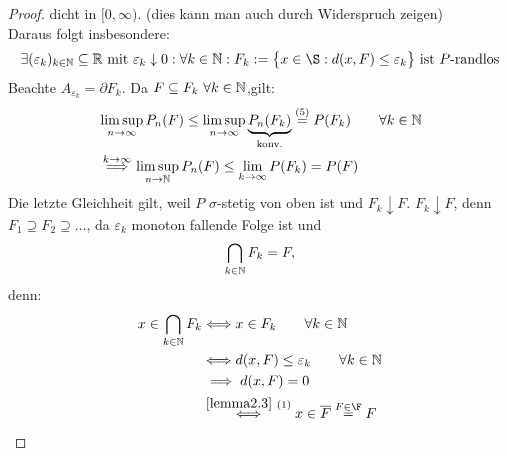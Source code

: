 \begin{proof}
dicht in $[0,\infty)$. (dies kann man auch durch Widerspruch zeigen)\\
Daraus folgt insbesondere:
\begin{align*}
\exists(\varepsilon_k)_{k\in\N}\subseteq\R\mit\varepsilon_k\downarrow0:\forall	 k\in\N: F_k:=\big\lbrace x\in\S:d(x,F)\leq\varepsilon_k\big\rbrace\text{ ist $P$-randlos}
\end{align*}
Beachte $A_{\varepsilon_k}=\partial F_k$. Da $F\subseteq F_k~\forall k\in\mathbb{N}$,gilt:
\begin{align*}
&\limsup\limits_{n\to\infty} P_n(F)
\leq\limsup\limits_{n\to\infty} \underbrace{P_n(F_k)}_{\text{konv.}}
\stackrel{(5)}{=}
P(F_k)\qquad\forall k\in\mathbb{N}\\
&\stackrel{k\to\infty}{\implies}
\limsup\limits_{n\to\mathbb{N}} P_n(F)
\leq\lim\limits_{k\to\infty} P(F_k)
=P(F)
\end{align*}
Die letzte Gleichheit gilt, weil $P$ $\sigma$-stetig von oben ist und $F_k\downarrow F$. $F_k\downarrow F$, denn $F_1\supseteq F_2\supseteq\ldots$, da $\varepsilon_k$ monoton fallende Folge ist und
\begin{align*}
\bigcap\limits_{k\in\mathbb{N}}F_k=F, 
\end{align*}
denn: 
\begin{align*}
x\in\bigcap\limits_{k\in\N}F_k
&\Longleftrightarrow
x\in F_k\qquad\forall k\in\N\\
&\Longleftrightarrow
d(x,F)\leq\varepsilon_k\qquad\forall k\in\N\\
&\implies
d(x,F)=0\\
&\stackrel{\ref{lemma2.3}~(1)}{\Longleftrightarrow}
x\in \overline{F}\stackeq{F\in\F}F
\end{align*}
\end{proof}



